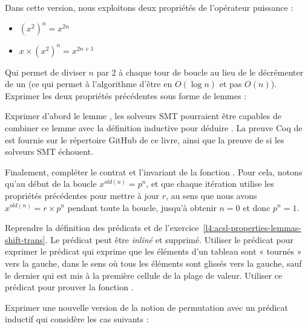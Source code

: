 

Dans cette version, nous exploitons deux propriétés de l'opérateur puissance :


\begin{itemize}
\item $(x^2)^n = x^{2n}$
\item $x \times (x^2)^n = x^{2n+1}$
\end{itemize}


Qui permet de diviser $n$ par 2 à chaque tour de boucle au lieu de le décrémenter
de un (ce qui permet à l'algorithme d'être en $O(\log n)$ et pas $O(n)$). Exprimer
les deux propriétés précédentes sous forme de lemmes :




Exprimer d'abord le lemme , les solveurs SMT pourraient
être capables de combiner ce lemme avec la définition inductive pour déduire
. La preuve Coq de  est fournie
sur le répertoire GitHub de ce livre, ainsi que la preuve de 
si les solveurs SMT échouent.


Finalement, compléter le contrat et l'invariant de la fonction .
Pour cela, notons qu'au début de la boucle $x^{old(n)} = p^n$, et que chaque itération
utilise les propriétés précédentes pour mettre à jour $r$, au sens que nous avons
$x^{old(n)} = r \times p^n$ pendant toute la boucle, jusqu'à obtenir $n = 0$ et donc
$p ^n = 1$.






Reprendre la définition des prédicats  et 
de l'exercice~\ref{l4:acsl-properties-lemmas-shift-trans}. Le prédicat
 peut être \textit{inliné} et supprimé. Utiliser le prédicat
 pour exprimer le prédicat  qui exprime que
les éléments d'un tableau sont « tournés » vers la gauche, dans le sens où tous les
éléments sont glissés vers la gauche, sauf le dernier qui est mis à la première
cellule de la plage de valeur. Utiliser ce prédicat pour prouver la fonction
.





Exprimer une nouvelle version de la notion de permutation avec un prédicat inductif
qui considère les cas suivants :

